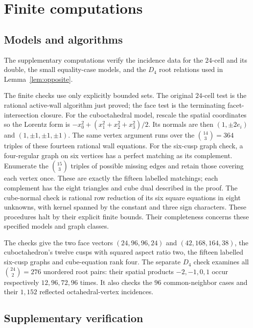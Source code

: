 \documentclass[11pt]{article}
\theoremstyle{remark}
\begin{document}
\appendix
\section{Finite computations}\label{app:reproduction}

\subsection{Models and algorithms}

The supplementary computations verify the incidence data for the
$24$-cell and its double, the small equality-case models, and the
$D_4$ root relations used in Lemma~\ref{lem:opposite}.

The finite checks use only explicitly bounded sets. The original
$24$-cell test is the rational active-wall algorithm just proved;
the face test is the terminating facet-intersection closure. For the
cuboctahedral model, rescale the spatial coordinates so the Lorentz
form is $-x_0^2+(x_1^2+x_2^2+x_3^2)/2$. Its normals are then
$(1,\pm2e_i)$ and $(1,\pm1,\pm1,\pm1)$. The same vertex argument
runs over the $\binom{14}{3}=364$ triples of these fourteen rational
wall equations. For the six-cusp graph check, a
four-regular graph on six vertices has a perfect matching as its
complement. Enumerate the $\binom{15}{3}$ triples of possible missing
edges and retain those covering each vertex once. These are exactly
the fifteen labelled matchings; each complement has the eight
triangles and cube dual described in the proof. The cube-normal
check is rational row reduction of its six square equations in
eight unknowns, with kernel spanned by the constant and three sign
characters. These procedures halt by their explicit finite bounds.
Their completeness concerns these specified models and graph classes.

The checks give the two face vectors
$(24,96,96,24)$ and $(42,168,164,38)$, the cuboctahedron's twelve
cusps with squared aspect ratio two, the fifteen labelled six-cusp
graphs and cube-equation rank four. The separate $D_4$ check examines
all $\binom{24}{2}=276$ unordered root pairs: their spatial products
$-2,-1,0,1$ occur respectively $12,96,72,96$ times. It also checks
the $96$ common-neighbor cases and their $1,152$ reflected
octahedral-vertex incidences.

\subsection{Supplementary verification}
\end{document}
